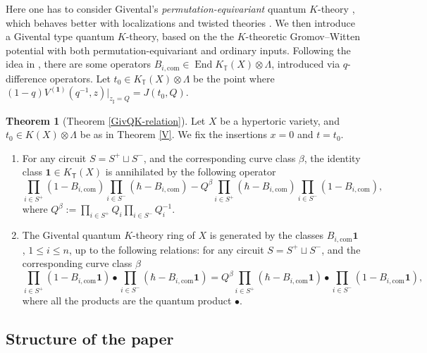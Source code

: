 \documentclass[10pt]{amsart}
\theoremstyle{definition}
\def\TT{\mathbb{T}}
\newcommand{\bone}{\mathbf{1}}
\newcommand{\End}{\operatorname{End}}
\newcommand{\com}{\mathrm{com}}
\newcommand{\bT}{\mathsf{T}}
\theoremstyle{definition}
\numberwithin{equation}{section}
\theoremstyle{Theorem}
\newtheorem{Theorem}[Definition]{Theorem}
\begin{document}
Here one has to consider Givental's \emph{permutation-equivariant} quantum $K$-theory \cite{Giv1}, which behaves better with localizations and twisted theories \cite{GV}. We then introduce a Givental type quantum $K$-theory, based on the the $K$-theoretic Gromov--Witten potential with both permutation-equivariant and ordinary inputs. Following the idea in \cite{IMT}, there are some operators $B_{i, \com} \in \End K_\TT(X) \otimes \Lambda$, introduced via $q$-difference operators. Let $t_0 \in K_\TT (X) \otimes \Lambda$ be the point where $(1-q) V^{(\bone)} (q^{-1} , z) \big|_{z_\sharp = Q} = J(t_0, Q)$.

\begin{Theorem} [Theorem \ref{GivQK-relation}]
	
	\setlength{\parskip}{1ex}
	
	Let $X$ be a hypertoric variety, and $t_0 \in K(X) \otimes \Lambda$ be as in Theorem \ref{V}. We fix the insertions $x = 0$ and $t = t_0$.
	
	\begin{enumerate}[1)]
		
		\item For any circuit $S = S^+\sqcup S^-$, and the corresponding curve class $\beta$, the identity class $\bone \in K_\bT (X)$ is annihilated by the following operator
		$$
		\prod_{i\in S^+} ( 1 - B_{i, \com}) \prod_{i\in S^-} (\hbar - B_{i, \com} ) - Q^\beta \prod_{i\in S^+} (\hbar - B_{i, \com} ) \prod_{i\in S^-} (1 - B_{i, \com}),
		$$
		where $Q^\beta := \prod_{i\in S^+} Q_i \prod_{i\in S^-} Q_i^{-1}$. 
		
		\item The Givental quantum $K$-theory ring of $X$ is generated by the classes $B_{i, \com} \bone$, $1\leq i\leq n$, up to the following relations: for any circuit $S = S^+\sqcup S^-$, and the corresponding curve class $\beta$
		$$
		\prod_{i\in S^+} ( 1 - B_{i, \com} \bone) \bullet \prod_{i\in S^-} (\hbar - B_{i, \com} \bone ) = Q^\beta \prod_{i\in S^+} (\hbar - B_{i, \com} \bone ) \bullet \prod_{i\in S^-} (1 - B_{i, \com} \bone ),
		$$
		where all the products are the quantum product $\bullet$.
		
	\end{enumerate}
	
\end{Theorem}



\subsection{Structure of the paper}
\end{document}
